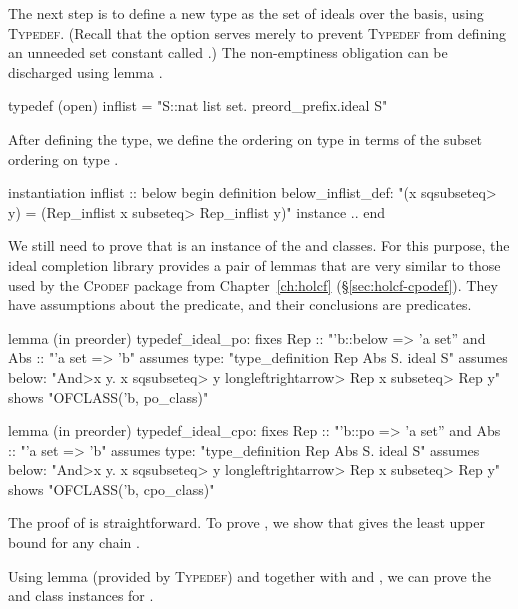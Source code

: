 The next step is to define a new type as the set of ideals over the basis, using \textsc{Typedef}. (Recall that the  option serves merely to prevent \textsc{Typedef} from defining an unneeded set constant called .) The non-emptiness obligation can be discharged using lemma .
%
\begin{isacode}
typedef (open) inflist = "{S::nat list set. preord_prefix.ideal S}"
\end{isacode}
%
After defining the type, we define the ordering  on type  in terms of the subset ordering on type .
%
\begin{isacode}
instantiation inflist :: below
begin
  definition below_inflist_def: "(x \<sqsubseteq> y) = (Rep_inflist x \<subseteq> Rep_inflist y)"
  instance ..
end
\end{isacode}
%
We still need to prove that  is an instance of the  and  classes. For this purpose, the ideal completion library provides a pair of lemmas that are very similar to those used by the \textsc{Cpodef} package from Chapter~\ref{ch:holcf} (\S\ref{sec:holcf-cpodef}). They have assumptions about the  predicate, and their conclusions are  predicates.
%
\begin{isacode}
lemma (in preorder) typedef_ideal_po:
  fixes Rep :: "'b::below => 'a set'' and Abs :: "'a set => 'b"
  assumes type: "type_definition Rep Abs {S. ideal S}"
  assumes below: "\<And>x y. x \<sqsubseteq> y \<longleftrightarrow> Rep x \<subseteq> Rep y"
  shows "OFCLASS('b, po_class)"
\end{isacode}
\unmedskip
{}
\begin{isacode}
lemma (in preorder) typedef_ideal_cpo:
  fixes Rep :: "'b::po => 'a set'' and Abs :: "'a set => 'b"
  assumes type: "type_definition Rep Abs {S. ideal S}"
  assumes below: "\<And>x y. x \<sqsubseteq> y \<longleftrightarrow> Rep x \<subseteq> Rep y"
  shows "OFCLASS('b, cpo_class)"
\end{isacode}
%
The proof of  is straightforward. To prove , we show that  gives the least upper bound for any chain .

Using lemma  (provided by \textsc{Typedef}) and  together with  and , we can prove the  and  class instances for .

